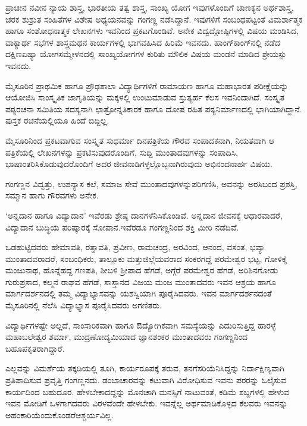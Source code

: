 {ಪ್ರಾಚೀನ  \enginline{-}  ನವೀನ ನ್ಯಾಯ ಶಾಸ್ತ್ರ, ಭಾರತೀಯ ತತ್ವ ಶಾಸ್ತ್ರ, ಸಾಂಖ್ಯ  \enginline{-}  ಯೋಗ ಇವುಗಳೊಂದಿಗೆ ಚಾಣಕ್ಯನ ಅರ್ಥಶಾಸ್ತ್ರ, ಚರಕ  \enginline{-}  ಶುಶ್ರುತ ಸಂಹಿತೆಗಳ ವಿಶೇಷ ಅಧ್ಯಯನವನ್ನು ಗಂಗಣ್ಣ ನಡೆಸಿದ್ದಾನೆ. ಇವುಗಳಿಗೆ ಸಂಬಂಧಪಟ್ಟಂತೆ ವಿಮರ್ಶಾತ್ಮಕ ಹಾಗೂ ಸಂಶೋಧನಾತ್ಮಕ ಲೇಖನಗಳು ಇವನಿಂದ ಪ್ರಕಟಗೊಂಡಿವೆ. ಅನೇಕ \hbox{ವಿದ್ವದ್ಗೋಷ್ಠಿಗಳಲ್ಲಿ} ವಿಷಯ ಮಂಡಿಸಿದ, ವಾಕ್ಯಾರ್ಥ ಸಭೆಗಳ ಶಾಸ್ತ್ರಮಥನ ಕಾರ್ಯಗಳಲ್ಲಿ \hbox{ಭಾಗವಹಿಸಿದ} ಹಿರಿಮೆ ಇವನದು. ಹಾಂಗ್‍ಕಾಂಗ್‍ನಲ್ಲಿ ನಡೆದ ದಕ್ಷಿಣಏಷ್ಯಾ \hbox{ಯೋಗಸಮ್ಮೇಳನದಲ್ಲಿ} ಸಾಂಖ್ಯ\enginline{-}ಯೋಗಗಳ ಕುರಿತು ಮೌಲಿಕ ವಿಷಯ ಮಂಡನೆ ಮಾಡಿದ ಶ್ರೇಯಸ್ಸು \hbox{ಇವನದು.}

ಮೈಸೂರಿನ ಪ್ರಾಥಮಿಕ ಹಾಗೂ ಪ್ರೌಢಶಾಲಾ ವಿದ್ಯಾರ್ಥಿಗಳಿಗೆ ರಾಮಾಯಣ ಹಾಗೂ ಮಹಾಭಾರತ ಪರೀಕ್ಷೆಯನ್ನು ಆಯೋಜಿಸಿ ಸಾಂಸ್ಕೃತಿಕ ಜಾಗೃತಿಯನ್ನು ಮಕ್ಕಳಲ್ಲಿ ಉಂಟುಮಾಡುವ ಸ್ತುತ್ಯರ್ಹ ಕೆಲಸ ಇವನಿಂದಾಗಿದೆ. ಸಂಸ್ಕೃತ ಪಠ್ಯರಚನಾ ಸಮಿತಿಯ ಸದಸ್ಯನಾಗಿ ಛಾತ್ರೋನ್ನತಿಕಾರಕ ಹಾಗೂ ದೋಷ ರಹಿತ ಪಠ್ಯನಿರ್ಮಾಣದಲ್ಲಿ ಭಾಗಿಯಾಗಿದ್ದಾನೆ. ಪುಸ್ತಕ ರಚನೆಯಲ್ಲಿಯೂ ಹಿಂದೆ ಬಿದ್ದಿಲ್ಲ.

ಮೈಸೂರಿನಿಂದ ಪ್ರಕಟವಾಗುವ ಸಂಸ್ಕೃತ ಸುಧರ್ಮಾ ದಿನಪತ್ರಿಕೆಯ ಗೌರವ ಸಂಪಾದಕ\-ನಾಗಿ, ನಿಯತವಾಗಿ ಆ ಪತ್ರಿಕೆಯಲ್ಲಿ ಲೇಖನಗಳನ್ನು ಪ್ರಕಟಿಸುವುದ\-ರೊಂದಿಗೆ, ಸುದ್ದಿ ಮುಂತಾದವುಗಳನ್ನು ಸಂಪಾದಿಸಿ, ಭಾಷಾಂತರಿಸಿಕೊಡುವುದ\-ರೊಂದಿಗೆ ಅದರ ಜೀವನಾಡಿಗಳ್ಳಲ್ಲೊಬ್ಬನಾಗಿರುವುದು ಅಭಿನಂದನಾರ್ಹ ವಿಷಯ.

ಗಂಗಣ್ಣನ ವಿದ್ವತ್ತು, ಉಪನ್ಯಾಸ ಕಲೆ, ಸಮಾಜ ಸೇವೆ ಮುಂತಾದವುಗಳನ್ನು\break ಪರಿಗಣಿಸಿ, ಅವನನ್ನು ಅರಸಿಬಂದ ಪ್ರಶಸ್ತಿ, ಸಮ್ಮಾನ ಹಾಗು ಗೌರವಗಳು ಅನೇಕ.

‘ಅನ್ನದಾನ ಹಾಗೂ ವಿದ್ಯಾದಾನ’   \enginline{-}   ಇವೆರಡು ಶ್ರೇಷ್ಠ ದಾನಗಳೆನಿಸಿಕೊಂಡಿವೆ. ಅನ್ನದಾನ ಜೀವನಕ್ಕೆ ಆಧಾರವಾದರೆ, ವಿದ್ಯಾದಾನ ಬುದ್ಧಿಯ ಪರಿಷ್ಕಾರಕ್ಕೆ ಸೋಪಾನ.\break ಇವೆರಡೂ ಗಂಗಣ್ಣನಿಂದ ಶಕ್ತಿ ಮೀರಿ ನಡೆದಿವೆ. 

ಒಡಹುಟ್ಟಿದವರು ಹೇಮಾವತಿ, ರತ್ನಾವತಿ, ಪ್ರವೀಣ, ರಾಮಚಂದ್ರ, ಅರವಿಂದ, ಆನಂದ, ವಸಂತ, ಭವ್ಯಾ ಮುಂತಾದವರಾದರೆ, ಸಂಬಂಧಿಕರು, ತಾಲ್ಲೂಕು ಮತ್ತು\break ಜಿಲ್ಲೆಯವರಾದ ಸಂಕರಗದ್ದೆ ಪರಮೇಶ್ವರ ಭಟ್ಟ, ಗೋಳಿಕೈ ಮಂಜುನಾಥ, ಹೊನ್ನೆಹದ್ದ ಗಣಪತಿ, ಶೀಬಳಿ ಶ್ರೀಪಾದ ಹೆಗಡೆ,  ಅಗ್ಗೆರೆ ಪರಮೇಶ್ವರ ಹೆಗಡೆ, ಅರಿಶಿನಗೋಡು ಗುರುಪ್ರಸಾದ, ಕಲ್ಮನೆ ರಾಘವ ಹೆಗಡೆ, ಸಾಸ್ತಾನದ ವಿಜಯ ಮಂಜ ಮುಂತಾದವರು ಇವನ ಆಶ್ರಯ ಹಾಗೂ ಮಾರ್ಗದರ್ಶನದಲ್ಲಿ ತಮ್ಮ ವಿದ್ಯಾಭ್ಯಾಸವನ್ನು ಯಶಸ್ವಿಯಾಗಿ ಪೂರೈಸಿದವರು. ಇವನ ಮಾರ್ಗದರ್ಶನದಂತೆ ಮೈಸೂರಿನಲ್ಲಿ ನೆಲೆಸಿ \hbox{ವಿದ್ಯಾಭ್ಯಾಸ} ಪೂರೈಸಿ\-ದವರು ಅಗಣಿತರು.
\eject

ವಿದ್ಯಾರ್ಥಿಗಳಷ್ಟೇ ಅಲ್ಲದೆ, ಸಾಂಸಾರಿಕವಾಗಿ ಹಾಗೂ ಔದ್ಯೋಗಿಕವಾಗಿ ಸಮಸ್ಯೆಯನ್ನು ಎದುರಿಸುತ್ತಿದ್ದ ಹಾರಳ್ಳೆ ಮಹಾಬಲೇಶ್ವರ ಶರ್ಮಾ, ಮುದ್ರಣೋದ್ಯಮಿಯಾದ ಜ್ಞಾನಶಂಕರ ಮುಂತಾದವರು ಗಂಗಣ್ಣನಿಂದ ಬಹೂಪಕೃತರಾಗಿದ್ದಾರೆ.

ಎಲ್ಲವನ್ನು ವಿಮರ್ಶೆಯ ತಕ್ಕಡಿಯಲ್ಲಿ ತೂಗಿ, ಕಾರ್ಯರೂಪಕ್ಕೆ ತರುವ, ತನಗೆ\break ಸರಿಯೆನಿಸಿದ್ದನ್ನು ನಿರ್ದಾಕ್ಷಿಣ್ಯವಾಗಿ ಪ್ರತಿಪಾದಿಸುವ ಪ್ರವೃತ್ತಿ ಗಂಗಣ್ಣನದು. ಡಂಬಾಚಾರವನ್ನು ಕಟುವಾಗಿ ವಿರೋಧಿಸುವ ಇವನು ಪರರನ್ನು ಓಲೈಸುವ ಕಾರ್ಯದಿಂದ ಬಹುದೂರ. ಹೇಳಬೇಕಾದದ್ದನ್ನು ಮೊನಚಾಗಿ ಮನಸ್ಸಿಗೆ ನಾಟುವಂತೆ, ಕಡಿಮೆ \hbox{ಶಬ್ದಗಳಲ್ಲಿ} ಹೇಳುವ ಇವನ ಮೋಡಿಗೆ ಒಳಗಾಗದವರು ವಿರಳವೆಂದೇ ಹೇಳಬೇಕು. ಇವನ್ನೆಲ್ಲ ಅರ್ಥಮಾಡಿಕೊಳ್ಳದ ಕೆಲವರು ಇವನನ್ನು ಅಹಂಕಾರಿಯೆಂದುಕೊಂಡರೆ\break ಆಶ್ಚರ್ಯವಿಲ್ಲ.

}
